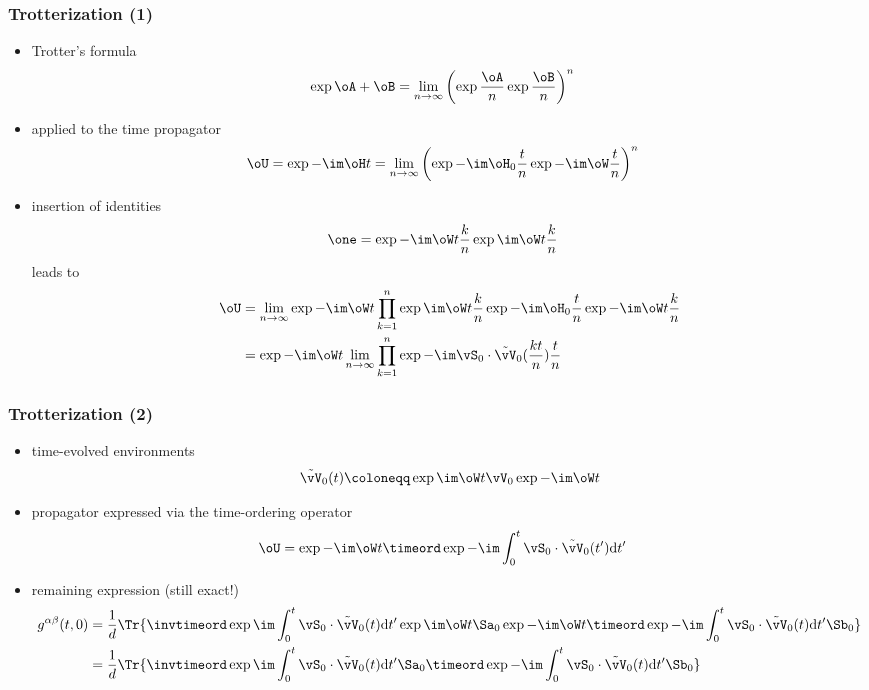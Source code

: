 \begin{frame}
	\frametitle{ Trotterization (1) }
    \begin{itemize}
        \item Trotter's formula 
        \begin{align*}
            \exp{\oA+\oB} &= \lim_{n\to\infty} \left( \exp{\frac{\oA}{n}} \exp{\frac{\oB}{n}} \right)^{n}
        \end{align*}
        \item applied to the time propagator
        \begin{align*}
            \oU &= \exp{-\im \oH t} = \lim_{n\to\infty} \left( \exp{-\im \oH_0 \frac{t}{n}} \exp{-\im \oW \frac{t}{n}} \right)^{n}
        \end{align*}
        \item insertion of identities
        \begin{align*}
            \one &= \exp{-\im \oW t \frac{k}{n}} \exp{\im \oW t \frac{k}{n}}
        \end{align*}
        leads to
        \begin{align*}
            \oU &= \lim_{n\to\infty} \exp{-\im \oW t} \prod_{k=1}^{n} \exp{\im \oW t \frac{k}{n}} \exp{-\im \oH_0 \frac{t}{n}} \exp{-\im \oW t \frac{k}{n}} \\
            &= \exp{-\im \oW t} \lim_{n\to\infty} \prod_{k=1}^{n} \exp{-\im \vS_0 \cdot \tilde{\vV}_0(\frac{kt}{n}) \frac{t}{n}}
        \end{align*}
    \end{itemize}
\end{frame}

\begin{frame}
	\frametitle{ Trotterization (2) }
    \begin{itemize}
        \item time-evolved environments
        \begin{align*}
            \tilde{\vV}_0(t) \coloneqq \exp{\im \oW t} \vV_0 \exp{-\im \oW t}
        \end{align*}
        \item propagator expressed via the time-ordering operator
        \begin{align*}
            \oU &= \exp{-\im \oW t} \timeord \exp{ -\im \int_0^t \vS_0 \cdot \tilde{\vV}_0(t') \mathrm{d}t' }
        \end{align*}
        \item remaining expression (still exact!)
        \begin{align*}
            g^{\alpha\beta}(t,0) &= \frac{1}{d} \Tr{ \invtimeord \exp{ \im \int_0^t \vS_0 \cdot \tilde{\vV}_0(t) \mathrm{d}t' } \exp{\im \oW t} \Sa_0 \exp{-\im \oW t} \timeord \exp{ -\im \int_0^t \vS_0 \cdot \tilde{\vV}_0(t) \mathrm{d}t' } \Sb_0 } \\
            &= \frac{1}{d} \Tr{ \invtimeord \exp{ \im \int_0^t \vS_0 \cdot \tilde{\vV}_0(t) \mathrm{d}t' } \Sa_0 \timeord \exp{ -\im \int_0^t \vS_0 \cdot \tilde{\vV}_0(t) \mathrm{d}t' } \Sb_0 }
        \end{align*}
    \end{itemize}
\end{frame}

